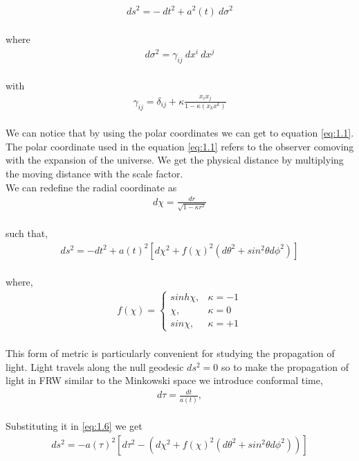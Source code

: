 \begin{align}
    d{s^2} = -\ d{t^2} + a^2(t) \ d{\sigma^2}\label{eq:1.2}
\end{align}\\
where 
\begin{align}
     d{\sigma^2} = \gamma_{ij} \ d{x^{i}} \ d{x^{j}}\label{eq:1.3}
\end{align}\\
with 
\begin{align}
    \gamma_{ij}= \delta_{ij} + \kappa\frac{x_{i}x_{j}}{1-\kappa(x_k x^k)}\label{eq:1.4}
\end{align}\\
\hspace{0.5cm}We can notice that by using the polar coordinates we can  get to equation \ref{eq:1.1}. The polar coordinate used in the equation \ref{eq:1.1} refers to the observer comoving with the expansion of the universe. We get the physical distance by multiplying the moving distance with the scale factor.\\
We can redefine the radial coordinate as  
\begin{align}
    d\chi = \frac{dr}{\sqrt{1-\kappa r^2}}\label{eq:1.5}
\end{align}\\
such that,
\begin{align}
   ds^2= -dt^2 + a(t)^2\left[{d\chi^2}+ f(\chi)^2(d\theta^2 +sin^2\theta d\phi^2)\right ]\label{eq:1.6}
\end{align}\\
where,
\begin{align}
    f(\chi) = \begin{cases}
        sinh\chi,& \kappa=-1\\
        \chi,& \kappa=0\\
        sin\chi,& \kappa=+1
    \end{cases}
\end{align}\\
This form of metric is particularly convenient for studying the propagation of light. Light travels along the null geodesic $ds^2=0$ so to make the propagation of light in FRW similar to the Minkowski space we introduce conformal time,
\begin{align}
    d\tau = \frac{dt}{a(t)},\label{eq:1.8}
\end{align}\\
Substituting it in \ref{eq:1.6} we get 
\begin{align}
    ds^2= -a(\tau)^2\left[d\tau^2 - \left({d\chi^2}+ f(\chi)^2(d\theta^2 +sin^2\theta d\phi^2)\right)\right ]\label{eq:1.9}
\end{align}
    
